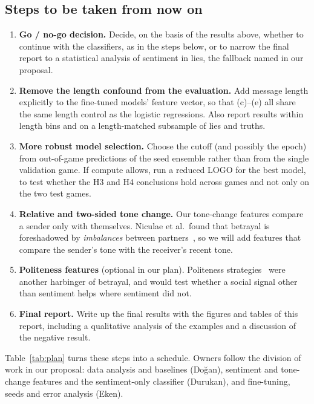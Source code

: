 \documentclass[conference]{IEEEtran}
\begin{document}
\subsection{Steps to be taken from now on}
\begin{enumerate}
\item \textbf{Go / no-go decision.} Decide, on the basis of the results above, whether to continue with the classifiers, as in the steps below, or to narrow the final report to a statistical analysis of sentiment in lies, the fallback named in our proposal.
\item \textbf{Remove the length confound from the evaluation.} Add message length explicitly to the fine-tuned models' feature vector, so that (c)--(e) all share the same length control as the logistic regressions. Also report results within length bins and on a length-matched subsample of lies and truths.
\item \textbf{More robust model selection.} Choose the cutoff (and possibly the epoch) from out-of-game predictions of the seed ensemble rather than from the single validation game. If compute allows, run a reduced LOGO for the best model, to test whether the H3 and H4 conclusions hold across games and not only on the two test games.
\item \textbf{Relative and two-sided tone change.} Our tone-change features compare a sender only with themselves. Niculae et al.\ found that betrayal is foreshadowed by \emph{imbalances} between partners~\cite{niculae2015harbingers}, so we will add features that compare the sender's tone with the receiver's recent tone.
\item \textbf{Politeness features} (optional in our plan). Politeness strategies~\cite{danescu2013politeness} were another harbinger of betrayal, and would test whether a social signal other than sentiment helps where sentiment did not.
\item \textbf{Final report.} Write up the final results with the figures and tables of this report, including a qualitative analysis of the examples and a discussion of the negative result.
\end{enumerate}

Table~\ref{tab:plan} turns these steps into a schedule. Owners follow the division of work in our proposal: data analysis and baselines (Do\u{g}an), sentiment and tone-change features and the sentiment-only classifier (Durukan), and fine-tuning, seeds and error analysis (Eken).
\end{document}
